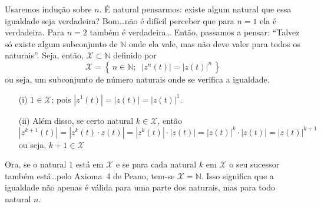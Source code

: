 \begin{solution}
  Usaremos indução sobre $n$.
		É natural pensarmos: existe algum natural que essa igualdade seja 
		verdadeira?
		Bom\ldots não é difícil perceber que para $n=1$ ela é verdadeira.
		Para $n=2$ também é verdadeira\ldots
		Então, passamos a pensar: ``Talvez só existe algum subconjunto de 
		$ \mathbb{N} $ onde ela vale, mas não deve valer para todos os naturais''.
	 Seja, então, $ \mathcal{X} \subset \mathbb{N} $ definido por
	 \[
	  \mathcal{X} = 
		 \left\{\,
		 n \in \mathbb{N};\;\; \left| z^{n}(t) \right| = \left| z(t) \right|^{n}
		 \,\right\}
	 \]
	 ou seja, um subconjunto de número naturais onde se verifica a igualdade.
	 \begin{enumerate}
	  \item[(i)] $ 1 \in \mathcal{X} $; pois 
		  $
			  \left| z^{1}(t) \right| = 
			  \left| z(t) \right| =
			  \left| z(t) \right|^{1}
	 		$.
		 \item[(ii)] Além disso, se certo natural $ k \in \mathcal{X} $, então 
		  \[
			  \left| z^{k + 1}(t) \right| = 
		 	 \left| z^{k}(t) \cdot z(t) \right| =
				 \left| z^{k}(t) \right| \cdot \left| z(t) \right| = 
				 \left| z(t) \right|^{k} \cdot \left| z(t) \right| =
				 \left| z(t) \right|^{k + 1}
				\]
		  ou seja, ${k+1}\in\mathcal{X}$
	 \end{enumerate}
	 Ora, se o natural $ 1 $ está em $ \mathcal{X} $ e se para cada natural 
		$ k $ em $ \mathcal{X} $ o seu sucessor também está\ldots pelo Axioma~4
		de Peano, tem-se $ \mathcal{X} = \mathbb{N} $. Isso significa que a 
		igualdade não apenas é válida para uma parte dos naturais, mas para todo
		natural $ n $.
\end{solution}